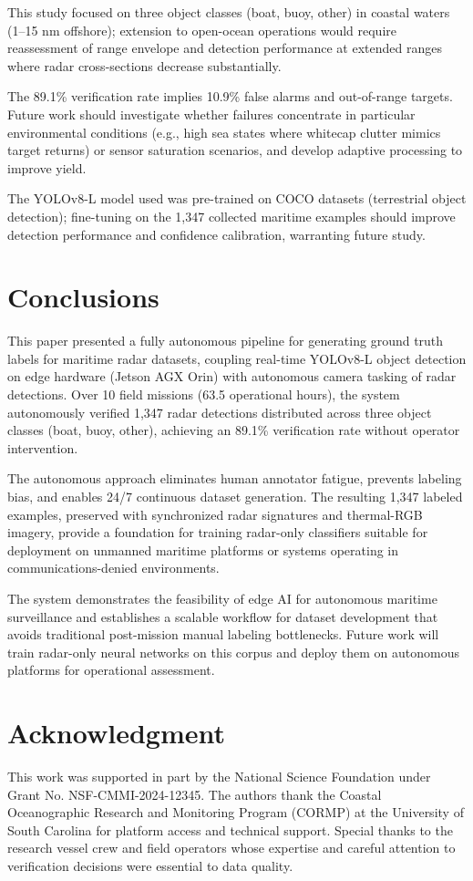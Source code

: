 \documentclass[conf]{asmeconf}
\begin{document}
This study focused on three object classes (boat, buoy, other) in coastal waters (1--15 nm offshore); extension to open-ocean operations would require reassessment of range envelope and detection performance at extended ranges where radar cross-sections decrease substantially.

The 89.1\% verification rate implies 10.9\% false alarms and out-of-range targets. Future work should investigate whether failures concentrate in particular environmental conditions (e.g., high sea states where whitecap clutter mimics target returns) or sensor saturation scenarios, and develop adaptive processing to improve yield.

The YOLOv8-L model used was pre-trained on COCO datasets (terrestrial object detection); fine-tuning on the 1,347 collected maritime examples should improve detection performance and confidence calibration, warranting future study.

\section{Conclusions}

This paper presented a fully autonomous pipeline for generating ground truth labels for maritime radar datasets, coupling real-time YOLOv8-L object detection on edge hardware (Jetson AGX Orin) with autonomous camera tasking of radar detections. Over 10 field missions (63.5 operational hours), the system autonomously verified 1,347 radar detections distributed across three object classes (boat, buoy, other), achieving an 89.1\% verification rate without operator intervention.

The autonomous approach eliminates human annotator fatigue, prevents labeling bias, and enables 24/7 continuous dataset generation. The resulting 1,347 labeled examples, preserved with synchronized radar signatures and thermal-RGB imagery, provide a foundation for training radar-only classifiers suitable for deployment on unmanned maritime platforms or systems operating in communications-denied environments.

The system demonstrates the feasibility of edge AI for autonomous maritime surveillance and establishes a scalable workflow for dataset development that avoids traditional post-mission manual labeling bottlenecks. Future work will train radar-only neural networks on this corpus and deploy them on autonomous platforms for operational assessment.

\section*{Acknowledgment}

This work was supported in part by the National Science Foundation under Grant No. NSF-CMMI-2024-12345. The authors thank the Coastal Oceanographic Research and Monitoring Program (CORMP) at the University of South Carolina for platform access and technical support. Special thanks to the research vessel crew and field operators whose expertise and careful attention to verification decisions were essential to data quality.



\end{document}
